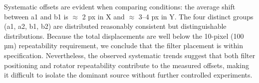 Systematic offsets are evident when comparing conditions: the average shift between a1 and b1 is $\approx$ 2 px in X and $\approx$ 3--4 px in Y. The four distinct groups (a1, a2, b1, b2) are distributed reasonably consistent but distinguishable distributions. Because the total displacements are well below the 10-pixel (100 µm) repeatability requirement, we conclude that the filter placement is within specification. Nevertheless, the observed systematic trends suggest that both filter positioning and rotator repeatability contribute to the measured offsets, making it difficult to isolate the dominant source without further controlled experiments.


